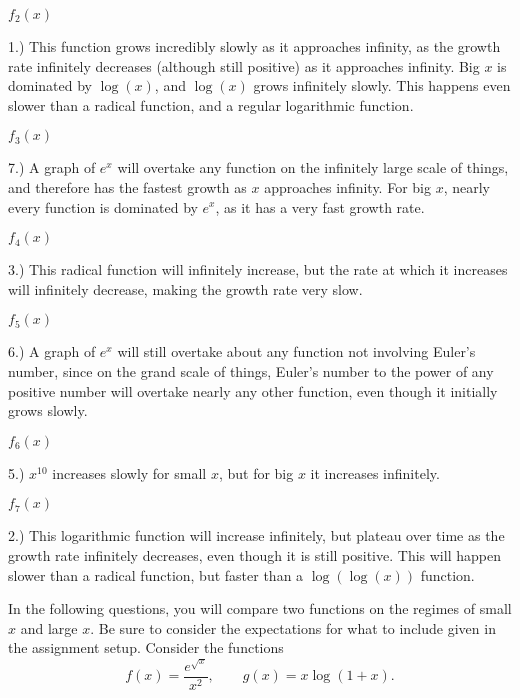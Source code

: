\documentclass[answers,addpoints]{exam}
\newcommand\pts[1][2]{\textcolor{MyBlue}{\text{\bf [#1 pts]}}}
\begin{document}
\begin{questions}
\begin{solution}
\textbf{$f_2(x)$}

1.) This function grows incredibly slowly as it approaches infinity, as the growth rate infinitely decreases (although still positive) as it approaches infinity. Big $x$ is dominated by $\log(x)$, and $\log(x)$ grows infinitely slowly. This happens even slower than a radical function, and a regular logarithmic function.

\textbf{$f_3(x)$}

7.) A graph of $e^x$ will overtake any function on the infinitely large scale of things, and therefore has the fastest growth as $x$ approaches infinity. For big $x$, nearly every function is dominated by $e^x$, as it has a very fast growth rate.

\textbf{$f_4(x)$}

3.) This radical function will infinitely increase, but the rate at which it increases will infinitely decrease, making the growth rate very slow.

\textbf{$f_5(x)$}

6.) A graph of $e^x$ will still overtake about any function not involving Euler’s number, since on the grand scale of things, Euler’s number to the power of any positive number will overtake nearly any other function, even though it initially grows slowly.

\textbf{$f_6(x)$}

5.) $x^{10}$ increases slowly for small $x$, but for big $x$ it increases infinitely.

\textbf{$f_7(x)$}

2.) This logarithmic function will increase infinitely, but plateau over time as the growth rate infinitely decreases, even though it is still positive. This will happen slower than a radical function, but faster than a $\log(\log(x))$ function.

\end{solution}

\hrulefill

In the following questions, you will compare two functions on the regimes of small $x$ and large $x$. Be sure to consider the expectations for what to include given in the assignment setup.
\question \pts[4] Consider the functions
\[
f(x)=\frac{e^{\sqrt{x}}}{x^2},\qquad
g(x)=x\log(1+x).
\]
\end{questions}
\end{document}
